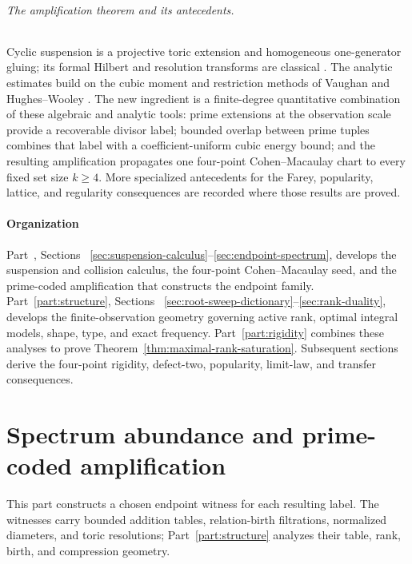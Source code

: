 \documentclass[11pt,reqno]{amsart}
\theoremstyle{definition}
\theoremstyle{remark}
\begin{document}
\paragraph{The amplification theorem and its antecedents.}
Cyclic suspension is a projective toric extension and homogeneous
one-generator gluing; its formal Hilbert and resolution transforms are
classical \cite{Sahin2011,GimenezSrinivasan2019,GimenezSrinivasan2025}.
The analytic estimates build on the cubic moment and restriction methods of
Vaughan and Hughes--Wooley \cite{Vaughan1986,HughesWooley2022}.  The new
ingredient is a finite-degree quantitative combination of these algebraic
and analytic tools: prime extensions at the observation scale provide a
recoverable divisor label; bounded overlap between prime tuples combines
that label with a coefficient-uniform cubic energy bound; and the resulting
amplification propagates one four-point Cohen--Macaulay chart to every fixed
set size $k\geq4$.  More specialized antecedents for the Farey, popularity,
lattice, and regularity consequences are recorded where those results are
proved.

\subsection*{Organization}

Part~\ref{part:spectrum}, Sections~
\ref{sec:suspension-calculus}--\ref{sec:endpoint-spectrum}, develops the
suspension and collision calculus, the four-point Cohen--Macaulay seed, and
the prime-coded amplification that constructs the endpoint family.
Part~\ref{part:structure}, Sections~
\ref{sec:root-sweep-dictionary}--\ref{sec:rank-duality}, develops the
finite-observation geometry governing active rank, optimal integral models,
shape, type, and exact frequency.  Part~\ref{part:rigidity} combines these
analyses to prove Theorem~\ref{thm:maximal-rank-saturation}.  Subsequent
sections derive the four-point rigidity, defect-two, popularity, limit-law,
and transfer consequences.

\part{Spectrum abundance and prime-coded amplification}
\label{part:spectrum}

This part constructs a chosen endpoint witness for each resulting label.
The witnesses carry bounded addition tables, relation-birth filtrations,
normalized diameters, and toric resolutions; Part~\ref{part:structure}
analyzes their table, rank, birth, and compression geometry.
\end{document}
